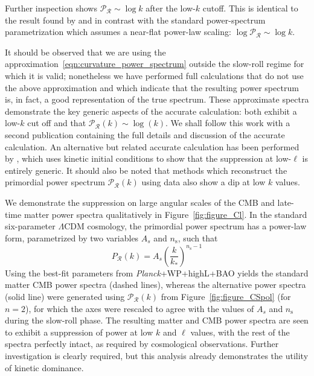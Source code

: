 Further inspection shows $\mathcal{P}_\mathcal{R} \sim \log k$ after the low-$k$ cutoff. This is identical to the result found by \citet{lasenby_closed_2003} and in contrast with the standard power-spectrum parametrization which assumes a near-flat power-law scaling: $\log\mathcal{P}_\mathcal{R}\sim \log k$. 

 
It should be observed that we are using the approximation~\eqref{eqn:curvature_power_spectrum} outside the slow-roll regime for which it is valid; nonetheless we have performed full calculations that do not use the above approximation and which indicate that the resulting power spectrum is, in fact, a good representation of the true spectrum. These approximate spectra demonstrate the key generic aspects of the accurate calculation: both exhibit a low-$k$ cut off and that $\mathcal{P}_\mathcal{R}(k) \sim \log(k)$.  We shall follow this work with a second publication containing the full details and discussion of the accurate calculation. An alternative but related accurate calculation has been performed by \citep{Lello_tensor_2013}, which uses kinetic initial conditions to show that the suppression at low-$\ell$ is entirely generic. It should also be noted that methods which reconstruct the primordial power spectrum $\mathcal{P}_\mathcal{R}(k)$ \citep{vazquez_reconstruction,Hazra_reconstruction_2013} using data also show a dip at low $k$ values.

We demonstrate the suppression on large angular scales of the CMB and late-time matter power spectra qualitatively in Figure~\ref{fig:figure_Cl}.  In the standard six-parameter $\Lambda$CDM cosmology, the primordial power spectrum has a power-law form, parametrized by two variables $A_s$ and $n_\mathrm{s}$, such that
%
\begin{equation}
  P_\mathcal{R}(k) = A_s{\left(\frac{k}{k_*}\right)}^{n_\mathrm{s}-1}
\end{equation}
%
Using the best-fit parameters from {\em Planck\/}+WP+highL+BAO \citep{planck_collaboration_planck_2013} yields the standard matter CMB power spectra (dashed lines), whereas the alternative power spectra (solid line) were generated using $\mathcal{P}_\mathcal{R}(k)$ from Figure~\ref{fig:figure_CSpol} (for $n=2$), for which the axes were rescaled to agree with the values of $A_s$ and $n_\mathrm{s}$ during the slow-roll phase. The resulting matter and CMB power spectra are seen to exhibit a suppression of power at low $k$ and $\ell$ values, with the rest of the spectra perfectly intact, as required by cosmological observations.  Further investigation is clearly required, but this analysis already demonstrates the utility of kinetic dominance.

